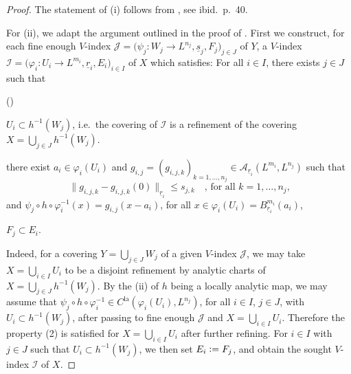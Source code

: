 \documentclass[a4paper, reqno, 10pt]{amsart}
\theoremstyle{definition}
\newenvironment{altenumeratelevel2}
{\begin{list}
		{\textup{(\theenumi)} }
		{\usecounter{enumii}
			\setlength{\labelwidth}{2em}
			\setlength{\labelsep}{0pt}
			\setlength{\leftmargin}{2em}
			\setlength{\itemsep}{2pt}
			\setlength{\topsep}{2pt}
			\setlength{\itemindent}{0pt}
			\renewcommand{\theenumi}{\arabic{enumii}}
	}}
	{\end{list}}
\numberwithin{equation}{section}
\newcommand{\defeq}{\vcentcolon=}
\newcommand{\la}{{\mathrm{la}}}
\newcommand{\norm}[1]{\lVert{#1}\rVert}
\newcommand{\ra}{\rightarrow}
\newcommand{\ul}[1]{{\underline{#1}}}
\newcommand{\CA}{{\mathcal {A}}}
\newcommand{\CI}{{\mathcal {I}}}
\newcommand{\CJ}{{\mathcal {J}}}
\begin{document}
\begin{proof}
	The statement of (i) follows from \cite[Prop.\ 1.1.7]{Emerton17LocAnVect}, see ibid.\ p.\ 40.
	
	
	For (ii), we adapt the argument outlined in the proof of \cite[Prop.\ 12.4 (ii)]{Schneider11pAdicLieGrps}.
	First we construct, for each fine enough $V$-index $\CJ=\big(\psi_j\colon W_j \ra L^{n_j},\ul{s}_j,F_j \big)_{j\in J}$ of $Y$, a $V$-index $\CI=\big(\varphi_i \colon U_i \ra L^{m_i},\ul{r}_i,E_i\big)_{i\in I}$ of $X$ which satisfies:
	For all $i \in I$, there exists $j\in J$ such that
	\begin{altenumeratelevel2}
		\item
		$U_i \subset h^{-1}(W_j)$, i.e.\ the covering of $\CI$ is a refinement of the covering $X= \bigcup_{j \in J} h^{-1}(W_j)$.
		\item
		there exist $a_i \in \varphi_i(U_i)$ and $g_{i,j}=(g_{i,j,k})_{k=1,\ldots,n_j} \in \CA_{\ul{r}_i} (L^{m_i}, L^{n_j})$ such that
		\begin{equation*}
			\norm{ g_{i,j,k}- g_{i,j,k}(0)}_{\ul{r}_i} \leq s_{j,k} \quad \text{, for all $k=1,\ldots,n_j$,}
		\end{equation*}
		and $\psi_j \circ h \circ \varphi_i^{-1} (x) = g_{i,j} (x-a_i)$, for all $x\in \varphi_i(U_i)= B_{\ul{r}_i}^{m_i}(a_i)$,
		\item
		$ F_j \subset E_i$.
	\end{altenumeratelevel2}
	Indeed, for a covering $Y = \bigcup_{j \in J} W_j$ of a given $V$-index $\CJ$, we may take $X = \bigcup_{i \in I} U_i$ to be a disjoint refinement by analytic charts of $X= \bigcup_{j \in J} h^{-1}(W_j)$.
	By the  (ii) of $h$ being a locally analytic map, we may assume that $\psi_j \circ h \circ \varphi_i^{-1} \in C^\la(\varphi_i(U_i), L^{n_j})$, for all $i\in I$, $j\in J$, with $U_i \subset h^{-1}(W_j)$, after passing to fine enough $\CJ$ and $X = \bigcup_{i \in I} U_i$.
	Therefore the property (2) is satisfied for $X = \bigcup_{i \in I} U_i$ after further refining.
	For $i\in I$ with $j\in J$ such that $U_i \subset h^{-1}(W_j)$, we then set $E_i \defeq F_j$, and obtain the sought $V$-index $\CI$ of $X$.
	

\end{proof}
\end{document}
